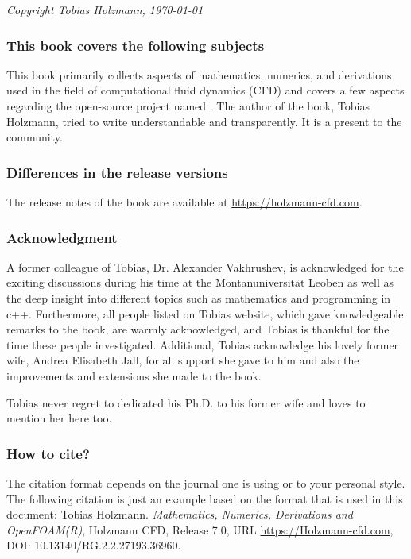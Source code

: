 %
%
\textit{Copyright Tobias Holzmann, \today}
%
%
\vspace{1cm}



\subsubsection*{This book covers the following subjects}
%
%
%
%
    This book primarily collects aspects of mathematics, numerics, and
    derivations used in the field of computational fluid dynamics (CFD) and
    covers a few aspects regarding the open-source project named \OF.
    The author of the book, Tobias Holzmann, tried to write understandable and
    transparently. It is a present to the \OF community.
%
%
%
%
%
\subsubsection*{Differences in the release versions}
%
%
	The release notes of the book are available at \url{https://holzmann-cfd.com}.
%
%
%
%
\subsubsection*{Acknowledgment}
%
%
%
%
    A former colleague of Tobias, Dr. Alexander Vakhrushev, is acknowledged for
    the exciting discussions during his time at the Montanuniversität Leoben
    as well as the deep insight into different topics such as mathematics and
    programming in c++. Furthermore, all people listed on Tobias website, which
    gave knowledgeable remarks to the book, are warmly acknowledged, and Tobias
    is thankful for the time these people investigated. Additional, Tobias
    acknowledge his lovely former wife, Andrea Elisabeth Jall, for all support
    she gave to him and also the improvements and extensions she made to the book.

    Tobias never regret to dedicated his Ph.D. to his former wife and loves to
    mention her here too.
%
%
%

\subsubsection*{How to cite?}
%
%
    The citation format depends on the journal one is using or to your personal
    style. The following citation is just an example based on the format that
    is used in this document:
    \vspace{0.5cm}
%
%
\newline
%
%
%
    Tobias Holzmann. \textit{Mathematics, Numerics, Derivations and OpenFOAM(R)},
    Holzmann CFD, Release 7.0, URL \url{https://Holzmann-cfd.com},
    DOI: 10.13140/RG.2.2.27193.36960.

